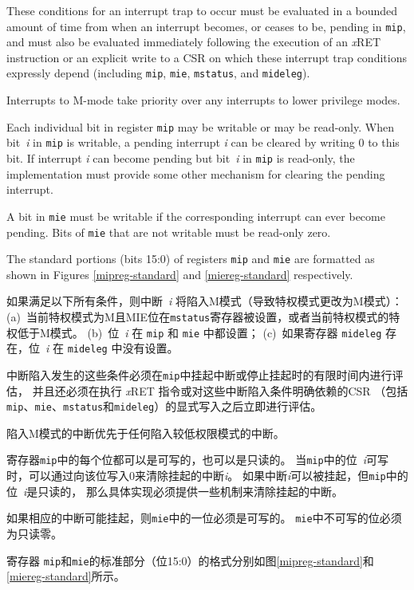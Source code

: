 These conditions for an interrupt trap to occur must be evaluated in a bounded
amount of time from when an interrupt becomes, or ceases to be,
pending in {\tt mip}, and must
also be evaluated immediately following the execution of an {\em x}\/RET
instruction or an explicit write to a CSR on which these interrupt trap
conditions expressly depend (including {\tt mip}, {\tt mie}, {\tt mstatus},
and {\tt mideleg}).

Interrupts to M-mode take priority over any interrupts to lower privilege
modes.

Each individual bit in register {\tt mip} may be writable or may be
read-only.
When bit~\textit{i} in {\tt mip} is writable, a pending interrupt
\textit{i} can be cleared by writing 0 to this bit.
If interrupt \textit{i} can become pending but bit~\textit{i} in
{\tt mip} is read-only, the implementation must provide some other
mechanism for clearing the pending interrupt.

A bit in {\tt mie} must be writable if the corresponding interrupt can
ever become pending.
Bits of {\tt mie} that are not writable must be read-only zero.

The standard portions (bits 15:0) of registers {\tt mip} and {\tt mie}
are formatted as shown in Figures \ref{mipreg-standard} and
\ref{miereg-standard} respectively.

\fi

如果满足以下所有条件，则中断~\textit{i} 将陷入M模式（导致特权模式更改为M模式）： 
(a)~当前特权模式为M且MIE位在{\tt mstatus}寄存器被设置，或者当前特权模式的特权低于M模式。 
(b)~位~\textit{i} 在 {\tt mip} 和 {\tt mie} 中都设置； 
(c)~如果寄存器 {\tt mideleg} 存在，位~\textit{i} 在 {\tt mideleg} 中没有设置。

中断陷入发生的这些条件必须在{\tt mip}中挂起中断或停止挂起时的有限时间内进行评估，
并且还必须在执行 {\em x}\/RET 指令或对这些中断陷入条件明确依赖的CSR
（包括{\tt mip}、{\tt mie}、{\tt mstatus}和{\tt mideleg}）的显式写入之后立即进行评估。

陷入M模式的中断优先于任何陷入较低权限模式的中断。

寄存器{\tt mip}中的每个位都可以是可写的，也可以是只读的。
当{\tt mip}中的位~\textit{i}可写时，可以通过向该位写入0来清除挂起的中断\textit{i}。
如果中断\textit{i}可以被挂起，但{\tt mip}中的位~\textit{i}是只读的，
那么具体实现必须提供一些机制来清除挂起的中断。

如果相应的中断可能挂起，则{\tt mie}中的一位必须是可写的。
{\tt mie}中不可写的位必须为只读零。

寄存器 {\tt mip}和{\tt mie}的标准部分（位15:0）的格式分别如图\ref{mipreg-standard}和\ref{miereg-standard}所示。


